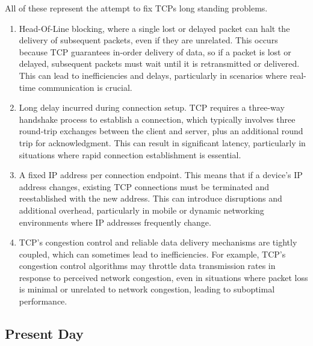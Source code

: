 All of these represent the attempt to fix TCPs long standing problems.
\begin{enumerate}
 \item Head-Of-Line blocking, where a single lost or delayed packet can halt the delivery of subsequent packets, even if they are unrelated. This occurs because TCP guarantees in-order delivery of data, so if a packet is lost or delayed, subsequent packets must wait until it is retransmitted or delivered. This can lead to inefficiencies and delays, particularly in scenarios where real-time communication is crucial.
 \item Long delay incurred during connection setup. TCP requires a three-way handshake process to establish a connection, which typically involves three round-trip exchanges between the client and server, plus an additional round trip for acknowledgment. This can result in significant latency, particularly in situations where rapid connection establishment is essential.
 \item A fixed IP address per connection endpoint. This means that if a device's IP address changes, existing TCP connections must be terminated and reestablished with the new address. This can introduce disruptions and additional overhead, particularly in mobile or dynamic networking environments where IP addresses frequently change.
 \item TCP's congestion control and reliable data delivery mechanisms are tightly coupled, which can sometimes lead to inefficiencies. For example, TCP's congestion control algorithms may throttle data transmission rates in response to perceived network congestion, even in situations where packet loss is minimal or unrelated to network congestion, leading to suboptimal performance.
\end{enumerate}

\subsection{Present Day}

